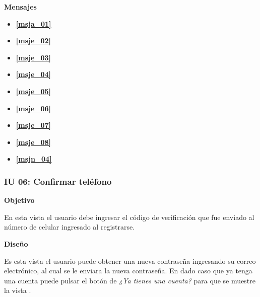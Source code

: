\textbf{Mensajes}
  \begin{itemize}
    \item \textbf{\ref{msja_01}}
    \item \textbf{\ref{msje_02}}
    \item \textbf{\ref{msje_03}}
    \item \textbf{\ref{msje_04}}
    \item \textbf{\ref{msje_05}}
    \item \textbf{\ref{msje_06}}
    \item \textbf{\ref{msje_07}}
    \item \textbf{\ref{msje_08}}
    \item \textbf{\ref{msjn_04}}
  \end{itemize}
  

      \subsubsection{IU 06: Confirmar teléfono} \label{iu06}
  \textbf{Objetivo} \par
  En esta vista el usuario debe ingresar el código de verificación que fue enviado al número de celular ingresado al registrarse. \par
  \textbf{Diseño} \par
  Es esta vista el usuario puede obtener una nueva contraseña ingresando su correo electrónico, al cual se le enviara la nueva contraseña. En dado caso que ya tenga una cuenta puede pulsar el botón de \textit{¿Ya tienes una cuenta?} para que se muestre la vista \textbf{}.
